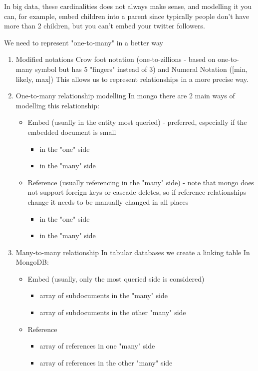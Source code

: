 \documentclass[11pt]{article}
\begin{document}
In big data, these cardinalities does not always make sense, and modelling it you can, for example, embed children into a parent since typically people don't have more than 2 children, but you can't embed your twitter followers.

We need to represent "one-to-many" in a better way

\begin{enumerate}
\item Modified notations
\label{sec:orgb0d576a}
Crow foot notation (one-to-zillions - based on one-to-many symbol but has 5 "fingers" instead of 3) and Numeral Notation ([min, likely, max])
This allows us to represent relationships in a more precise way.

\item One-to-many relationship modelling
\label{sec:org8c63eba}
In mongo there are 2 main ways of modelling this relationship:
\begin{itemize}
\item Embed (usually in the entity most queried) - preferred, especially if the embedded document is small
\begin{itemize}
\item in the "one" side
\item in the "many" side
\end{itemize}
\item Reference (usually referencing in the "many" side) - note that mongo does not support foreign keys or cascade deletes, so if reference relationships change it needs to be manually changed in all places 
\begin{itemize}
\item in the "one" side
\item in the "many" side
\end{itemize}
\end{itemize}

\item Many-to-many relationship
\label{sec:orga4dad08}
In tabular databases we create a linking table
In MongoDB:
\begin{itemize}
\item Embed (usually, only the most queried side is considered)
\begin{itemize}
\item array of subdocuments in the "many" side
\item array of subdocuments in the other "many" side
\end{itemize}
\item Reference
\begin{itemize}
\item array of references in one "many" side
\item array of references in the other "many" side
\end{itemize}
\end{itemize}


\end{enumerate}
\end{document}
